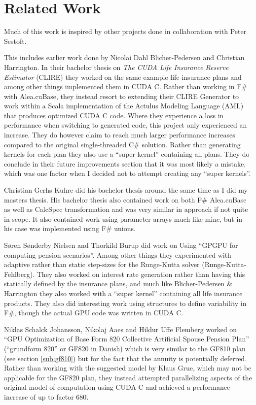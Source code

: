 \section{Related Work}\label{sec:relatedwork}
Much of this work is inspired by other projects done in collaboration with Peter Sestoft.

This includes earlier work done by Nicolai Dahl Blicher-Pedersen and Christian Harrington.
In their bachelor thesis on \emph{The CUDA Life Insurance Reserve Estimator} (CLIRE)\cite{dahlharrington} they worked on the same example life insurance plans and among other things implemented them in CUDA C.
Rather than working in F\# with Alea.cuBase, they instead resort to extending their CLIRE Generator to work within a Scala implementation of the Actulus Modeling Language (AML) that produces optimized CUDA C code.
Where they experience a loss in performance when switching to generated code, this project only experienced an increase.
They do however claim to reach much larger performance increases compared to the original single-threaded C\# solution.
Rather than generating kernels for each plan they also use a ``super-kernel'' containing all plans. 
They do conclude in their future improvements section that it was most likely a mistake, which was one factor when I decided not to attempt creating any ``super kernels''.

Christian Gerhs Kuhre\cite{christiangk} did his bachelor thesis around the same time as I did my masters thesis.
His bachelor thesis also contained work on both F\# Alea.cuBase as well as CalcSpec transformation and was very similar in approach if not quite in scope.
It also contained work using parameter arrays much like mine, but in his case was implemented using F\# unions.

S\o{}ren S\o{}nderby Nielsen and Thorkild Burup did work on Using ``GPGPU for computing pension scenarios''\cite{nielsenburup}. 
Among other things they experimented with adaptive rather than static step-sizes for the Runge-Kutta solver (Runge-Kutta-Fehlberg).
They also worked on interest rate generation rather than having this statically defined by the insurance plans, and much like Blicher-Pedersen \& Harrington they also worked with a ``super kernel'' containing all life insurance products.
They also did interesting work using structures to define variability in F\#, though the actual GPU code was written in CUDA C.

Niklas Schalck Johansson, Nikolaj Aaes and Hildur Uffe Flemberg worked on ``GPU Optimization of Base Form 820 Collective Artificial Spouse Pension Plan''\cite{aaesjohanssonflemberg} (``grundform 820'' or GF820 in Danish) which is very similar to the GF810 plan (see section \ref{sub:gf810}) but for the fact that the annuity is potentially deferred. 
Rather than working with the suggested model by Klaus Grue, which may not be applicable for the GF820 plan, they instead attempted parallelizing aspects of the original model of computation using CUDA C and achieved a performance increase of up to factor 680.
